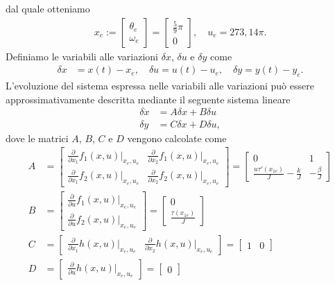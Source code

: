 \documentclass[a4paper, 11pt]{article}
\begin{document}
	dal quale otteniamo
	\begin{align}
		x_e := \begin{bmatrix}
			\theta_e \\
			\omega_e
		\end{bmatrix} = \begin{bmatrix}
			\frac{5}{9}\pi \\
			0
		\end{bmatrix},  \quad u_e = 273,14 \pi.\label{eq:equilibirum_pair}
	\end{align}
	Definiamo le variabili alle variazioni $\delta x$, $\delta u$ e $\delta y$ come 
	\begin{align*}
		\delta x &= x(t) - x_e, 
		\quad
		\delta u = u(t) - u_e, 
		\quad
		\delta y = y(t) - y_e.
	\end{align*}
	L'evoluzione del sistema espressa nelle variabili alle variazioni pu\`o essere approssimativamente descritta mediante il seguente sistema lineare
	\begin{subequations}\label{eq:linearized_system}
		\begin{align}
			\delta \dot{x} &= A\delta x + B\delta u
			\\
			\delta y &= C\delta x + D\delta u,
		\end{align}
	\end{subequations}
	dove le matrici $A$, $B$, $C$ e $D$ vengono calcolate come
	\newcommand{\pdv}[2]{\frac{\partial}{\partial #1}#2(x,u)|_{x_e,u_e}}
	\begin{subequations}\label{eq:matrices}
		\begin{align}
			A &=\begin{bmatrix}
				\pdv{x_1}{f_1} & \pdv{x_2}{f_1} \\
				\pdv{x_1}{f_2} & \pdv{x_2}{f_2}
			\end{bmatrix} = \begin{bmatrix}
				0 & 1 \\
				\frac{u\tau'(x_{1e})}{J} - \frac{k}{J} & - \frac{\beta}{J}
			\end{bmatrix}
			\\
			B &=\begin{bmatrix}
				\pdv{u}{f_1} \\
				\pdv{u}{f_2}
			\end{bmatrix} = \begin{bmatrix}
				0 \\
				\frac{\tau(x_{1e})}{J}
			\end{bmatrix}
			\\
			C &=\begin{bmatrix}
				\pdv{x_1}{h} & \pdv{x_2}{h}
			\end{bmatrix} = \begin{bmatrix}
				1 & 0
			\end{bmatrix}
			\\
			D &= \begin{bmatrix}
				\pdv{u}{h}
			\end{bmatrix} = \begin{bmatrix}
				0
			\end{bmatrix}
		\end{align}
	\end{subequations}
\end{document}

